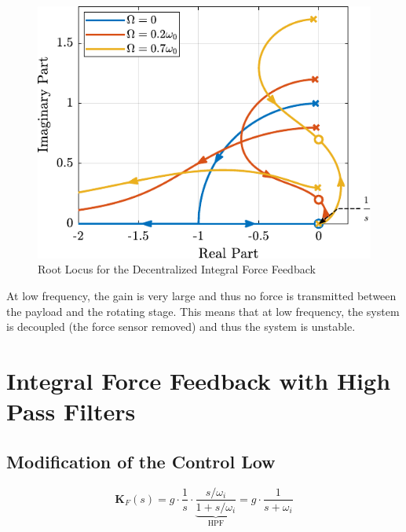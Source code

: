\documentclass{ISMA_USD2020}
\begin{document}
\begin{figure}[htbp]
\centering
\includegraphics[scale=1]{figs/root_locus_pure_iff.pdf}
\caption{\label{fig:root_locus_pure_iff}Root Locus for the Decentralized Integral Force Feedback}
\end{figure}

At low frequency, the gain is very large and thus no force is transmitted between the payload and the rotating stage.
This means that at low frequency, the system is decoupled (the force sensor removed) and thus the system is unstable.

\section{Integral Force Feedback with High Pass Filters}
\label{sec:org7f551f8}
\subsection{Modification of the Control Low}
\label{sec:org4c39c6d}
\begin{equation}
  \bm{K}_{F}(s) = g \cdot \frac{1}{s} \cdot \underbrace{\frac{s/\omega_i}{1 + s/\omega_i}}_{\text{HPF}} = g \cdot \frac{1}{s + \omega_i}
\end{equation}
\end{document}
